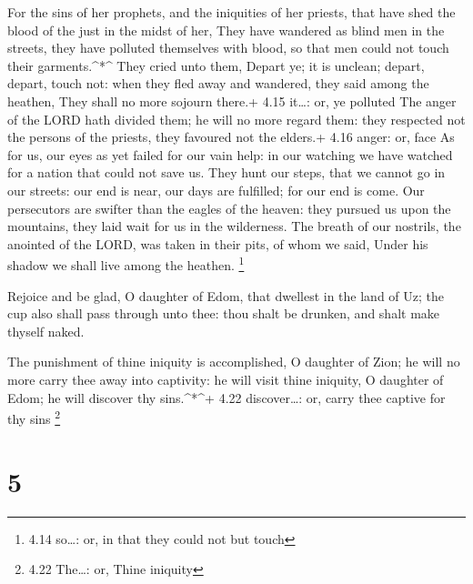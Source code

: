  For the sins of her prophets, and the iniquities of her
priests, that have shed the blood of the just in the midst of her,
 They have wandered as blind men in the streets, they have
polluted themselves with blood, so that men could not touch their
garments.\^{}*\^{}  They cried unto them, Depart ye; it is
unclean; depart, depart, touch not: when they fled away and wandered,
they said among the heathen, They shall no more sojourn there.+ 4.15
it\ldots: or, ye polluted  The anger of the LORD hath
divided them; he will no more regard them: they respected not the
persons of the priests, they favoured not the elders.+ 4.16 anger: or,
face  As for us, our eyes as yet failed for our vain help:
in our watching we have watched for a nation that could not save us.
 They hunt our steps, that we cannot go in our streets: our
end is near, our days are fulfilled; for our end is come. 
Our persecutors are swifter than the eagles of the heaven: they pursued
us upon the mountains, they laid wait for us in the wilderness.
 The breath of our nostrils, the anointed of the LORD, was
taken in their pits, of whom we said, Under his shadow we shall live
among the heathen. \footnote{4.14 so\ldots: or, in that they could not
  but touch}

 Rejoice and be glad, O daughter of Edom, that dwellest in
the land of Uz; the cup also shall pass through unto thee: thou shalt be
drunken, and shalt make thyself naked.

 The punishment of thine iniquity is accomplished, O
daughter of Zion; he will no more carry thee away into captivity: he
will visit thine iniquity, O daughter of Edom; he will discover thy
sins.\^{}*\^{}+ 4.22 discover\ldots: or, carry thee captive for thy sins
\footnote{4.22 The\ldots: or, Thine iniquity}

\hypertarget{section-4}{%
\section{5}\label{section-4}}

